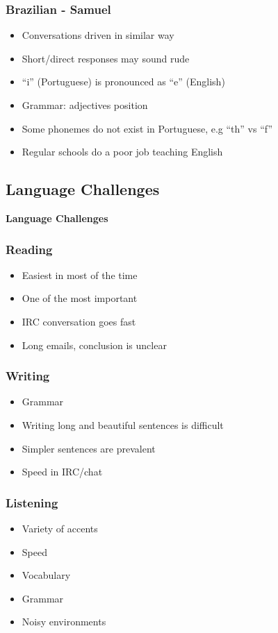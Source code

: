 \documentclass[aspectratio=169,11pt,hyperref={colorlinks=true}]{beamer}
\begin{document}
\begin{frame}
\frametitle{Brazilian - Samuel}
  \begin{itemize}
  \item Conversations driven in similar way
  \item Short/direct responses may sound rude
  \item ``i'' (Portuguese) is pronounced as ``e'' (English)
  \item Grammar: adjectives position
  \item Some phonemes do not exist in Portuguese, e.g ``th'' vs ``f''
  \item Regular schools do a poor job teaching English
  \end{itemize}
\end{frame}


\subsection{Language Challenges}
\begin{frame}
  \bf\Huge{Language Challenges}
\end{frame}

\begin{frame}
\frametitle{Reading}
  \begin{itemize}
  \item Easiest in most of the time
  \item One of the most important
  \item IRC conversation goes fast
  \item Long emails, conclusion is unclear
  \end{itemize}
\end{frame}

\begin{frame}
\frametitle{Writing}
  \begin{itemize}
  \item Grammar
  \item Writing long and beautiful sentences is difficult
  \item Simpler sentences are prevalent
  \item Speed in IRC/chat
  \end{itemize}
\end{frame}

\begin{frame}
\frametitle{Listening}
  \begin{itemize}
  \item Variety of accents
  \item Speed
  \item Vocabulary
  \item Grammar
  \item Noisy environments
  \end{itemize}
\end{frame}
\end{document}
